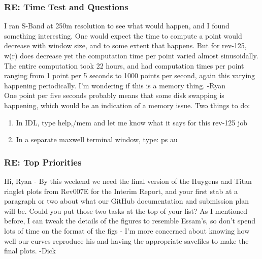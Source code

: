 \documentclass[crop=false,class=book]{standalone}
\begin{document}
\subsubsection{\footnotesize RE: Time Test and Questions}
I ran S-Band at 250m resolution to see what would happen, and I found something interesting.
One would expect the time to compute a point would decrease with window size, and to some extent that happens. But for rev-125, w(r) does decrease yet the computation time per point varied almost sinusoidally. The entire computation took 22 hours, and had computation times per point ranging from 1 point per 5 seconds to 1000 points per second, again this varying happening periodically. I'm wondering if this is a memory thing. -Ryan\\
One point per five seconds probably means that some disk swapping is happening, which would be an indication of a memory issue. Two things to do:
\begin{enumerate}
    \item In IDL, type help,/mem and let me know what it says for this rev-125 job
    \item In a separate maxwell terminal window, type: ps au
\end{enumerate}
\subsubsection{\footnotesize RE: Top Priorities}
Hi, Ryan - By this weekend we need the final version of the Huygens and Titan ringlet plots from Rev007E for the Interim Report, and your first stab at a paragraph or two about what our GitHub documentation and submission plan will be. Could you put those two tasks at the top of your list? As I mentioned before, I can tweak the details of the figures to resemble Essam's, so don't spend lots of time on the format of the figs - I'm more concerned about knowing how well our curves reproduce his and having the appropriate savefiles to make the final plots. -Dick
\end{document}
